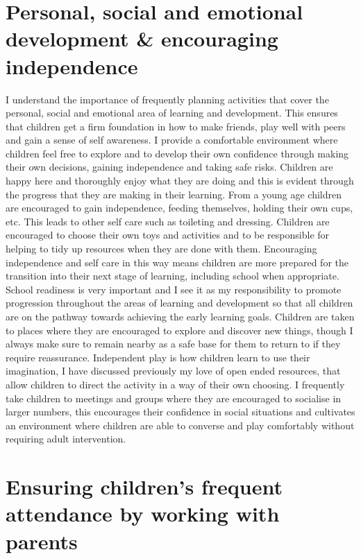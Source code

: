 \documentclass[10pt,a4paper]{report}
\makeatletter
\newcommand{\DESCRIPTION@original@item}{}
\let\DESCRIPTION@original@item\item
\newcommand*{\DESCRIPTION@envir}{DESCRIPTION}
\newlength{\DESCRIPTION@totalleftmargin}
\newlength{\DESCRIPTION@linewidth}
\newcommand{\DESCRIPTION@makelabel}[1]{\llap{#1}}%
\newcommand{\DESCRIPTION@item}[1][]{%
  \setlength{\@totalleftmargin}%
       {\DESCRIPTION@totalleftmargin+\widthof{\textbf{#1 }}-\leftmargin}%
  \setlength{\linewidth}
       {\DESCRIPTION@linewidth-\widthof{\textbf{#1 }}+\leftmargin}%
  \par\parshape \@ne \@totalleftmargin \linewidth
  \DESCRIPTION@original@item[\textbf{#1}]%
}
\newenvironment{DESCRIPTION}
  {\list{}{\setlength{\labelwidth}{0cm}%
           \let\makelabel\DESCRIPTION@makelabel}%
   \setlength{\DESCRIPTION@totalleftmargin}{\@totalleftmargin}%
   \setlength{\DESCRIPTION@linewidth}{\linewidth}%
   \renewcommand{\item}{\ifx\@currenvir\DESCRIPTION@envir
                           \expandafter\DESCRIPTION@item
                        \else
                           \expandafter\DESCRIPTION@original@item
                        \fi}}
  {\endlist}
\makeatother
\begin{document}
\begin{DESCRIPTION}
\section{Personal, social and emotional development \& encouraging independence}

I understand the importance of frequently planning activities that cover the personal, social and emotional area of learning and development. This ensures that children get a firm foundation in how to make friends, play well with peers and gain a sense of self awareness. I provide a comfortable environment where children feel free to explore and to develop their own confidence through making their own decisions, gaining independence and taking safe risks. Children are happy here and thoroughly enjoy what they are doing and this is evident through the progress that they are making in their learning. From a young age children are encouraged to gain independence, feeding themselves, holding their own cups, etc.  This leads to other self care such as toileting and dressing. Children are encouraged to choose their own toys and activities and to be responsible for helping to tidy up resources when they are done with them. Encouraging independence and self care in this way means children are more prepared for the transition into their next stage of learning, including school when appropriate. School readiness is very important and I see it as my responsibility to promote progression throughout the areas of learning and development so that all children are on the pathway towards achieving the early learning goals. Children are taken to places where they are encouraged to explore and discover new things, though I always make sure to remain nearby as a safe base for them to return to if they require reassurance. Independent play is how children learn to use their imagination, I have discussed previously my love of open ended resources, that allow children to direct the activity in a way of their own choosing. I frequently take children to meetings and groups where they are encouraged to socialise in larger numbers, this encourages their confidence in social situations and cultivates an environment where children are able to converse and play comfortably without requiring adult intervention.

\section{Ensuring children's frequent attendance by working with parents}


\end{DESCRIPTION}
\end{document}
